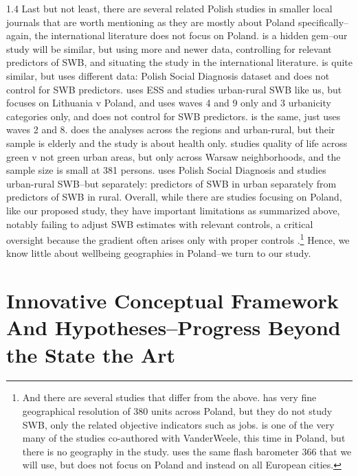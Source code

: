 \documentclass[10pt, letterpaper]{article}
\begin{document}
\begin{spacing}{1.4}
Last but not least, there are several related Polish studies in smaller local
journals that are worth mentioning as they are mostly about Poland
specifically--again, the international literature does not focus on Poland.
%
 \citet{cichocki2009changes}is a hidden gem--our study will be similar,
 but using more and newer data, controlling
 for relevant predictors of SWB, and situating the study in the international
 literature. 
 \citet{sompolska2020quality} is quite similar, but uses different data: Polish
Social Diagnosis dataset and does not control for SWB predictors. 
\citet{vaznoniene2021territorial} uses ESS and studies urban-rural SWB like us, but
 focuses on Lithuania v Poland, and uses waves 4 and 9 only and 3 urbanicity
 categories only, and does not control for SWB predictors. \citet{wojewodzka2023rural}
 is the same, just uses waves 2 and 8. 
\citet{tobiasz2017urban} does the analyses across the regions and urban-rural,
 but their sample is elderly and the study is about health only.
 \citet{stangierska2022urban} studies quality of life across green v not green
 urban areas, but only across Warsaw neighborhoods, and the sample size is small at 381 persons.
 \citet{sompolska2021happier} uses Polish Social Diagnosis and studies urban-rural 
 SWB--but separately: predictors of SWB in urban separately from predictors of
 SWB in rural. %
 Overall, while there are studies focusing on Poland, like our proposed study, they have
 important limitations as summarized above, notably failing to adjust SWB
 estimates with relevant controls, a critical oversight because the gradient
 often arises only with proper controls \citep{aok21}.\footnote{ 
 And there are several studies that differ from the
 above. \citet{churski2022geographical} has very fine 
 geographical resolution of 380 units across Poland, but they do not study SWB,
  only the related objective indicators such as jobs. 
 \citet{weziak2025understanding} is one of the very many of the studies
 co-authored with VanderWeele, this time in Poland, but there is no geography in
 the study.  
 \citet{wkeziak16} uses the same flash barometer 366 that we will use, but does
 not focus on Poland and instead on all European cities. 
}
 Hence,  we know little about wellbeing geographies in Poland--we
 turn to our study.%

\section{Innovative Conceptual Framework And Hypotheses--Progress Beyond the State the Art}


\end{spacing}
\end{document}
